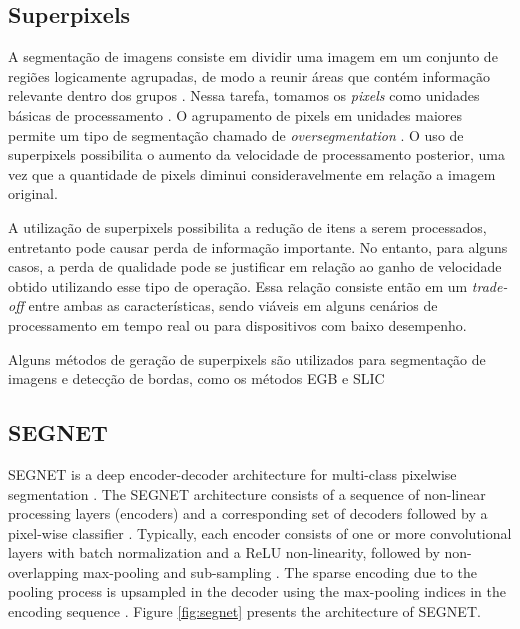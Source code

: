 \documentclass[10pt,twocolumn,letterpaper]{article}
\begin{document}
\subsection{Superpixels} \label{ssec:superpixels}

A segmentação de imagens consiste em dividir uma imagem em um conjunto de regiões logicamente agrupadas, de modo a reunir áreas que contém informação relevante dentro dos grupos \cite{DOMINGUEZ}. Nessa tarefa, tomamos os \textit{pixels} como unidades básicas de processamento \cite{WANG201728}. O agrupamento de pixels em unidades maiores permite um tipo de segmentação chamado de \textit{oversegmentation} \cite{WANG201728}. O uso de superpixels possibilita o aumento da velocidade de processamento posterior, uma vez que a quantidade de pixels diminui consideravelmente em relação a imagem original.

A utilização de superpixels possibilita a redução de itens a serem processados, entretanto pode causar perda de informação importante. No entanto, para alguns casos, a perda de qualidade pode se justificar em relação ao ganho de velocidade obtido utilizando esse tipo de operação. Essa relação consiste então em um \textit{trade-off} entre ambas as características, sendo viáveis em alguns cenários de processamento em tempo real ou para dispositivos com baixo desempenho.

Alguns métodos de geração de superpixels são utilizados para segmentação de imagens e detecção de bordas, como os métodos EGB \cite{FELZENSZWALB} e SLIC \cite{SLIC}


\subsection{SEGNET} \label{ssec:segnet}

SEGNET is a deep encoder-decoder architecture for multi-class pixelwise segmentation \cite{SEGNET}. The SEGNET architecture consists of a sequence of non-linear processing layers (encoders) and a corresponding set of decoders followed by a pixel-wise classifier \cite{SEGNET} \cite{SEGNET_WEBSITE}. Typically, each encoder consists of one or more convolutional layers with batch normalization and a ReLU non-linearity, followed by non-overlapping max-pooling and sub-sampling \cite{SEGNET} \cite{SEGNET_WEBSITE}. The sparse encoding due to the pooling process is upsampled in the decoder using the max-pooling indices in the encoding sequence \cite{SEGNET} \cite{SEGNET_WEBSITE}. Figure \ref{fig:segnet} presents the architecture of SEGNET.
\end{document}
